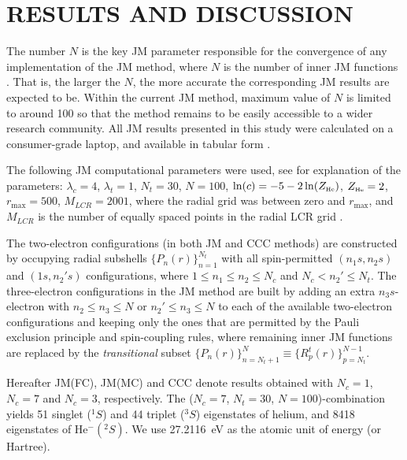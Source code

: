 \documentclass[aip
, pra
, showpacs
, aps
, twocolumn
, groupedaddress
, floatfix
]{revtex4}
\begin{document}
\section{RESULTS AND DISCUSSION}


The number $N$ is the key JM parameter responsible for the convergence of any implementation of the JM method,
where $N$ is the number of inner JM functions \cite{HY74p1201,BR76p1491}.
That is, the larger the $N$, the more accurate the corresponding JM results are expected to be.
Within the current JM method, maximum value of $N$ is limited to around 100 so that the method remains to be easily accessible
to a wider research community. All JM results presented in this study were calculated on a consumer-grade laptop,
and available in tabular form \cite{JMatrixWebsite}.


The following JM computational parameters were used, see \cite{KB10p022708} for explanation of the parameters:
$\lambda_c=4$, $\lambda_t=1$, $N_t=30$, $N=100$, $\ln(c)=-5 - 2\ln(Z_{\mbox{\tiny{He}}} )$, $Z_{\mbox{\tiny{He}}}=2$, $r_{\max}=500$,
$M_{LCR}=2001$, where the radial grid was between zero and $r_{\max}$, and
$M_{LCR}$ is the number of equally spaced points in the radial LCR grid \cite{KB10p022708}.


The two-electron configurations (in both JM and CCC methods) are constructed by occupying  radial subshells $\{P_n(r)\}_{n=1}^{N_t}$
with all spin-permitted $(n_1s,n_2s)$ and $(1s,n_2's)$ configurations,
where $1 \leq n_1 \leq n_2 \leq N_c$ and $N_c<n_2' \leq N_t$.
The three-electron configurations
in the JM method are built by adding an extra $n_3s$-electron with
$ n_2 \leq n_3 \leq N$ or $ n_2' \leq n_3 \leq N$ to each of the available two-electron configurations
and keeping only the ones that are permitted by the Pauli exclusion principle and spin-coupling rules,
where remaining inner JM functions are replaced by the {\em transitional} \cite{KFB11} subset $\{P_n(r)\}_{n=N_t+1}^{N} \equiv \{R^t_p(r)\}_{p=N_t}^{N-1}$.


Hereafter JM(FC), JM(MC) and CCC denote results obtained with $N_c=1$, $N_c=7$ and $N_c=3$, respectively.
The ($N_c=7$, $N_t=30$, $N=100$)-combination yields 51 singlet ($^1S$) and 44 triplet ($^3S$) eigenstates of helium, and 8418 eigenstates of He$^-(^2S)$.
We use 27.2116~eV as the atomic unit of energy (or Hartree).
\end{document}
